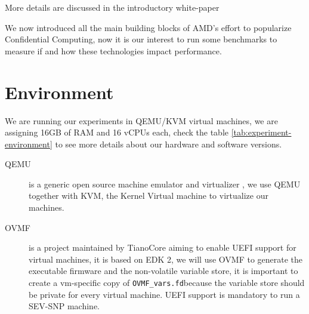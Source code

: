 \documentclass[twocolumn]{article}
\begin{document}
More details are discussed in the introductory white-paper \cite{sev-snp}

We now introduced all the main building blocks of AMD's effort to popularize Confidential Computing, now it is our interest to run some benchmarks to measure if and how these technologies impact performance.

\section{Environment}
\label{sec:environment}
    
We are running our experiments in QEMU/KVM virtual machines, we are assigning 16GB of RAM and 16 vCPUs each, check the table \ref*{tab:experiment-environment} to see more details about our hardware and software versions. 

\begin{description}
    \item[QEMU] is a generic open source machine emulator and virtualizer \cite{qemu}, we use QEMU together with KVM, the Kernel Virtual machine to virtualize our machines.
    \item[OVMF] is a project maintained by TianoCore \cite{ovmf} aiming to enable UEFI support for virtual machines, it is based on EDK 2, we will use OVMF to generate the executable firmware and the non-volatile variable store, it is important to create a vm-specific copy of \texttt{OVMF\_vars.fd}because the variable store should be private for every virtual machine. UEFI support is mandatory to run a SEV-SNP machine.
\end{description}
\end{document}
